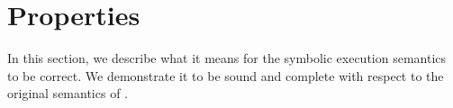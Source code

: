 


\section{Properties}
\label{sec:properties}

In this section, we describe what it means for the symbolic execution semantics to be correct.
We demonstrate it to be sound and complete with respect to the original semantics of \TOPHAT.

%
%
%
%
%
%
%
%
%
%
